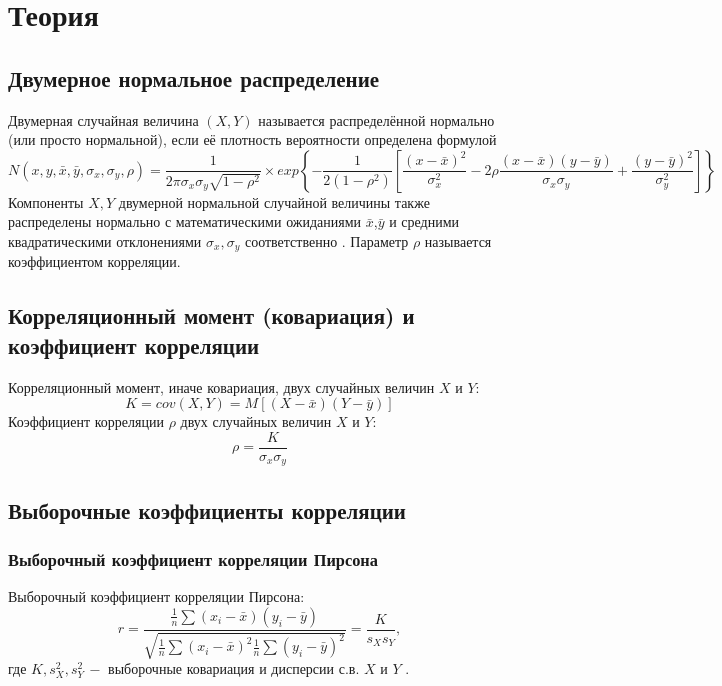 \newpage
\section{Теория}
\subsection{Двумерное нормальное распределение}
\begin{flushleft}
	Двумерная случайная величина $(X,Y)$ называется распределённой нормально (или просто нормальной), если её плотность вероятности определена формулой
	\begin{equation}
		N(x, y, \bar{x}, \bar{y}, \sigma_{x}, \sigma_{y}, \rho) = 
		\frac{1}{2\pi\sigma_{x}\sigma_{y}\sqrt{1-\rho^{2}}} \times
		exp{\left\lbrace 
				-\frac{1}{2(1-\rho^{2})}
				\left[  
					\frac{(x-\bar{x})^{2}}{\sigma_{x}^{2}} - 2\rho\frac{(x-\bar{x})(y-\bar{y})}{\sigma_{x}\sigma_{y}} + \frac{(y-\bar{y})^{2}}{\sigma_{y}^{2}}
				\right] 
		\right\rbrace}
		\label{N}
	\end{equation}
	Компоненты $X,Y$ двумерной нормальной случайной величины также распределены нормально с математическими ожиданиями $\bar{x}$,$\bar{y}$ и средними квадратическими отклонениями $\sigma_{x},\sigma_{y}$ соответственно \cite[с.~133-134]{1}.
	Параметр $\rho$ называется коэффициентом корреляции.
\end{flushleft}

\subsection{Корреляционный момент (ковариация) и коэффициент корреляции}
\begin{flushleft}
	Корреляционный момент, иначе ковариация, двух случайных величин $X$ и $Y$:
	\begin{equation}
		K = cov(X, Y) = M[(X - \bar{x})(Y - \bar{y})]
		\label{K}
	\end{equation}
	Коэффициент корреляции $\rho$ двух случайных величин $X$ и $Y$:
	\begin{equation}
		\rho = \frac{K}{\sigma_{x}\sigma_{y}}
		\label{ro}
	\end{equation}
\end{flushleft}

\subsection{Выборочные коэффициенты корреляции}
\subsubsection{Выборочный коэффициент корреляции Пирсона}
\begin{flushleft}
	Выборочный коэффициент корреляции Пирсона:
	\begin{equation}
		r = \frac{
			\frac{1}{n}\sum{(x_{i} - \bar{x})(y_{i}-\bar{y})}
		}{
			\sqrt{\frac{1}{n}\sum{(x_{i} - \bar{x})^{2}}\frac{1}{n}\sum{(y_{i} - \bar{y})^{2}}}
		}=\frac{K}{s_{X}s_{Y}},
		\label{r}
	\end{equation}
	где $K,s^{2}_{X},s^{2}_{Y}\,-$  выборочные ковариация и дисперсии с.в. $X$ и $Y$ \cite[с.~535]{1}.
\end{flushleft}


